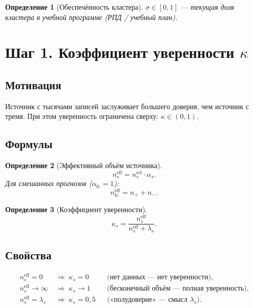 \documentclass[12pt,a4paper]{article}
\newtheorem{definition}{Определение}
\begin{document}
\begin{definition}[Обеспечённость кластера]
  $\sigma \in [0,1]$ --- текущая доля кластера в учебной программе
  (РПД / учебный план).
\end{definition}

\section{Шаг 1. Коэффициент уверенности $\kappa$}

\subsection{Мотивация}

Источник с тысячами записей заслуживает большего доверия, чем источник
с тремя. При этом уверенность ограничена сверху: $\kappa \in (0,1)$.

\subsection{Формулы}

\begin{definition}[Эффективный объём источника]
  \[
    n_s^{\mathrm{eff}} = n_s^{\mathrm{rel}} \cdot \alpha_s.
  \]
  Для смешанных прогнозов ($\alpha_{\mathrm{fc}} = 1$):
  \[
    n_{\mathrm{fc}}^{\mathrm{eff}} = n_+ + n_-.
  \]
\end{definition}

\begin{definition}[Коэффициент уверенности]
  \[
    \kappa_s = \frac{n_s^{\mathrm{eff}}}{n_s^{\mathrm{eff}} + \lambda_s}.
  \]
\end{definition}

\subsection{Свойства}

\begin{align*}
  n_s^{\mathrm{eff}} = 0     &\;\Rightarrow\; \kappa_s = 0
    && \text{(нет данных --- нет уверенности)}, \\
  n_s^{\mathrm{eff}} \to \infty &\;\Rightarrow\; \kappa_s \to 1
    && \text{(бесконечный объём --- полная уверенность)}, \\
  n_s^{\mathrm{eff}} = \lambda_s &\;\Rightarrow\; \kappa_s = 0{,}5
    && \text{(«полудоверие» --- смысл $\lambda_s$)}.
\end{align*}
\end{document}
